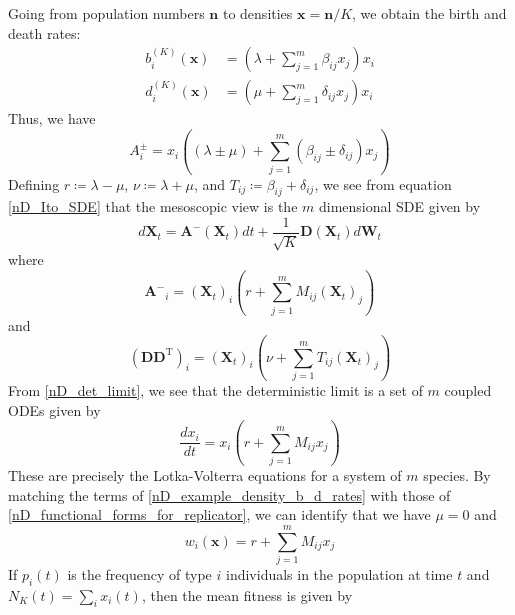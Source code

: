Going from population numbers $\mathbf{n}$ to densities $\mathbf{x} = \mathbf{n}/K$, we obtain the birth and death rates:
\begin{equation}
\label{nD_example_density_b_d_rates}
\begin{aligned}
b^{(K)}_i(\mathbf{x}) &= \left(\lambda + \sum\limits_{j=1}^{m}\beta_{ij}x_j\right)x_i\\
d^{(K)}_i(\mathbf{x}) &= \left(\mu + \sum\limits_{j=1}^{m}\delta_{ij}x_j\right)x_i
\end{aligned}
\end{equation}
Thus, we have
\begin{equation*}
A^{\pm}_{i} = x_i\left(\left(\lambda \pm \mu\right) + \sum\limits_{j=1}^{m}\left(\beta_{ij} \pm \delta_{ij}\right)x_j\right)
\end{equation*}
Defining $r \coloneqq \lambda - \mu$, $\nu \coloneqq \lambda + \mu$, and $T_{ij} \coloneqq \beta_{ij} + \delta_{ij}$, we see from equation \eqref{nD_Ito_SDE} that the mesoscopic view is the $m$ dimensional SDE given by
\begin{equation}
\label{nD_example_SDE}
d\mathbf{X}_{t} = \mathbf{A^-}(\mathbf{X}_t)dt + \frac{1}{\sqrt{K}}\mathbf{D}(\mathbf{X}_t)d\mathbf{W}_t
\end{equation}
where 
\begin{equation*}
\mathbf{A^-}_i = {(\mathbf{X}_{t})}_i(r + \sum\limits_{j=1}^{m}M_{ij}{(\mathbf{X}_{t})}_j) 
\end{equation*}
and
\begin{equation*}
(\mathbf{D}\mathbf{D}^{\mathrm{T}})_i = {(\mathbf{X}_{t})}_i(\nu + \sum\limits_{j=1}^{m}T_{ij}{(\mathbf{X}_{t})}_j) 
\end{equation*}
From \eqref{nD_det_limit}, we see that the deterministic limit is a set of $m$ coupled ODEs given by
\begin{equation}
\label{nD_example_det_limit}
\frac{d x_i}{dt} = x_i\left(r + \sum\limits_{j=1}^{m}M_{ij}x_j\right)
\end{equation}
These are precisely the Lotka-Volterra equations for a system of $m$ species. By matching the terms of \eqref{nD_example_density_b_d_rates} with those of \eqref{nD_functional_forms_for_replicator}, we can identify that we have $\mu = 0$ and
\begin{equation}
\label{nD_example_fitness}
w_i(\mathbf{x}) = r + \sum\limits_{j=1}^{m}M_{ij}x_j
\end{equation}
If $p_i(t)$ is the frequency of type $i$ individuals in the population at time $t$ and $N_K(t) = \sum_i x_i(t)$, then the mean fitness is given by
